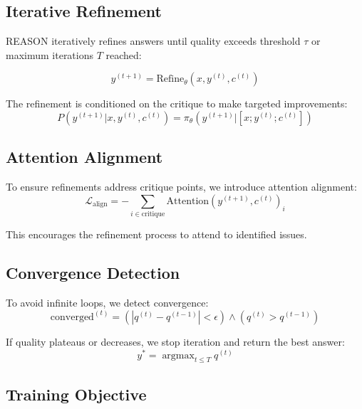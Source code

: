 \documentclass[11pt,a4paper]{article}
\newcommand{\argmax}{\operatorname{argmax}}
\begin{document}
\subsection{Iterative Refinement}

REASON iteratively refines answers until quality exceeds threshold $\tau$ or maximum iterations $T$ reached:

\begin{equation}
    y^{(t+1)} = \text{Refine}_\theta(x, y^{(t)}, c^{(t)})
\end{equation}

The refinement is conditioned on the critique to make targeted improvements:
\begin{equation}
    P(y^{(t+1)}|x, y^{(t)}, c^{(t)}) = \pi_\theta(y^{(t+1)} | [x; y^{(t)}; c^{(t)}])
\end{equation}

\subsection{Attention Alignment}

To ensure refinements address critique points, we introduce attention alignment:
\begin{equation}
    \mathcal{L}_{\text{align}} = -\sum_{i \in \text{critique}} \text{Attention}(y^{(t+1)}, c^{(t)})_i
\end{equation}

This encourages the refinement process to attend to identified issues.

\subsection{Convergence Detection}

To avoid infinite loops, we detect convergence:
\begin{equation}
    \text{converged}^{(t)} = (|q^{(t)} - q^{(t-1)}| < \epsilon) \land (q^{(t)} > q^{(t-1)})
\end{equation}

If quality plateaus or decreases, we stop iteration and return the best answer:
\begin{equation}
    y^* = \argmax_{t \leq T} q^{(t)}
\end{equation}

\subsection{Training Objective}
\end{document}
